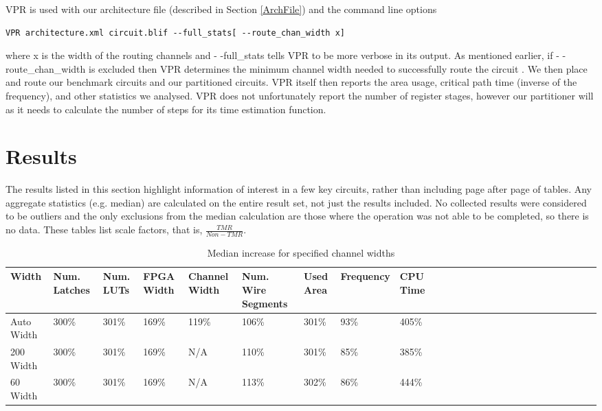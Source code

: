 \documentclass[12pt,final,oneside]{memoir} %
\begin{document}
\ac{VPR} is used with our architecture file (described in Section \ref{ArchFile}) and the command line options
\begin{lstlisting}
VPR architecture.xml circuit.blif --full_stats[ --route_chan_width x]
\end{lstlisting} where x is the width of the routing channels and - -full\_stats tells \ac{VPR} to be more verbose in its output.
As mentioned earlier, if - -route\_chan\_width is excluded then \ac{VPR} determines the minimum channel width needed to successfully route the circuit \cite{VPRManual}. We then place and route our benchmark circuits and our partitioned circuits. \ac{VPR} itself then reports the area usage, critical path time (inverse of the frequency), and other statistics we analysed. \ac{VPR} does not unfortunately report the number of register stages, however our partitioner will as it needs to calculate the number of steps for its time estimation function.

\section{Results}\label{BenchmarkResults}
The results listed in this section highlight information of interest in a few key circuits, rather than including page after page of tables. Any aggregate statistics (e.g. median) are calculated on the entire result set, not just the results included. No collected results were considered to be outliers and the only exclusions from the median calculation are those where the operation was not able to be completed, so there is no data.
These tables list scale factors, that is, $\frac{TMR}{Non-TMR}$.
\begin{table}
    \begin{adjustwidth}{-1cm}{-1.1cm}
        \begin{tabularx}{1.1\textwidth}{XXXXXXXXXXXXXXXXXXXXXXXXXX}
           \toprule
            Width & Num. Latches & Num. \acp{LUT} & FPGA Width & Channel Width & Num. Wire Segments & Used Area & Frequency & CPU Time\\
          \midrule
            Auto Width         & 300\% & 301\% & 169\% & 119\% & 106\% & 301\% & 93\% & 405\%\\
            200 Width          & 300\% & 301\% & 169\% & N/A   & 110\% & 301\% & 85\% & 385\%\\
            60 Width           & 300\% & 301\% & 169\% & N/A   & 113\% & 302\% & 86\% & 444\%\\
          \bottomrule
        \end{tabularx}
        \caption{Median increase for specified channel widths}
        \label{medianRes}
    \end{adjustwidth}
\end{table}
\end{document}
